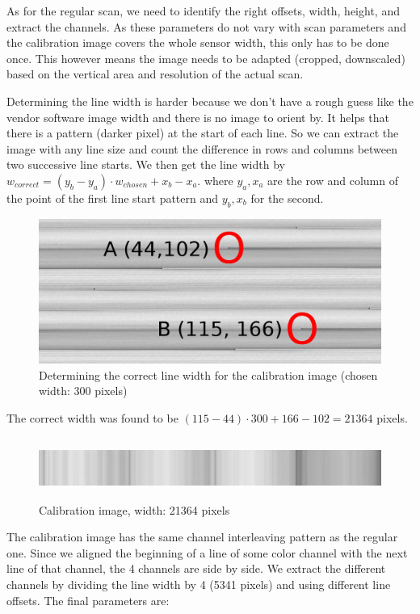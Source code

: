 \documentclass{article}
\begin{document}
As for the regular scan, we need to identify the right offsets, width, height, and
extract the channels. As these parameters do not vary with scan parameters and the
calibration image covers the whole sensor width, this only
has to be done once. This however means the image needs to be adapted (cropped, downscaled)
based on the vertical area and resolution of the actual scan.

Determining the line width is harder because we don't have a rough guess like the
vendor software image width and there is no image to orient by. It helps that there
is a pattern (darker pixel) at the start of each line. So we can extract the image
with any line size and count the difference in rows and columns between two successive
line starts. We then get the line width by $w_{correct} = (y_b - y_a) \cdot w_{chosen} + x_b - x_a$.
where $y_a, x_a$ are the row and column of the point of the first line start pattern
and $y_b, x_b$ for the second.

\begin{figure}[H]
  \caption{Determining the correct line width for the calibration image (chosen width: 300 pixels)}
  \centering
  \includegraphics[width=12cm]{images/extract_calib1.jpg}
\end{figure}

The correct width was found to be $(115 - 44) \cdot 300 + 166 - 102 = 21364$ pixels.

\begin{figure}[H]
  \caption{Calibration image, width: 21364 pixels}
  \centering
  \includegraphics[width=12cm, height=2cm]{images/extract_calib2.jpg}
\end{figure}

The calibration image has the same channel interleaving pattern as the regular one.
Since we aligned the beginning of a line of some color channel with the next line of that channel,
the 4 channels are side by side.
We extract the different channels by dividing the line width by 4 (5341 pixels)
and using different line offsets.
The final parameters are:
\end{document}

